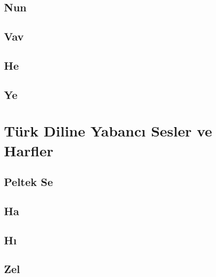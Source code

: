 \subsection*{Nun}
\uyumluharftablo{\arnun}{\latupnun\latdownnun}{\isimnun}{\trtlfnun}

\subsection*{Vav}
\uyumluharftablo{\arvav}{\latupvav\latdownvav}{\isimvav}{\trtlfvav}

\subsection*{He}
\uyumluharftablo{\arhe}{\latuphe\latdownhe}{\isimhe}{\trtlfhe}

\subsection*{Ye}
\uyumluharftablo{\arye}{\latupye\latdownye}{\isimye}{\trtlfye}



\section{Türk Diline Yabancı Sesler ve Harfler}

\subsection*{Peltek Se}
\hariciharftablo{\arthe}{\latupthe\latdownthe}{\isimthe}{\trtlfthe}{\artlfthe}

\subsection*{Ha}
\hariciharftablo{\arha}{\latupha\latdownha}{\isimha}{\trtlfha}{\artlfha}

\subsection*{Hı}
\hariciharftablo{\arxa}{\latupxa\latdownxa}{\isimxa}{\trtlfxa}{\artlfxa}

\subsection*{Zel}
\hariciharftablo{\arzel}{\latupzel\latdownzel}{\isimzel}{\trtlfzel}{\artlfzel}

